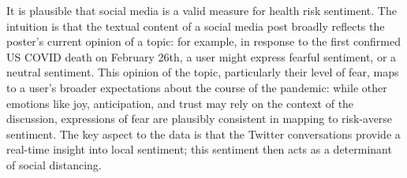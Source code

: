 \documentclass{article}
\begin{document}
It is plausible that social media is a valid measure for health risk sentiment. The intuition is that the textual content of a social media post broadly reflects the poster's current opinion of a topic: for example, in response to the first confirmed US COVID death on February 26th, a user might express fearful sentiment, or a neutral sentiment. This opinion of the topic, particularly their level of fear, maps to a user's broader expectations about the course of the pandemic: while other emotions like joy, anticipation, and trust may rely on the context of the discussion, expressions of fear are plausibly consistent in mapping to risk-averse sentiment. The key aspect to the data is that the Twitter conversations provide a real-time insight into local sentiment; this sentiment then acts as a determinant of social distancing.


\end{document}
